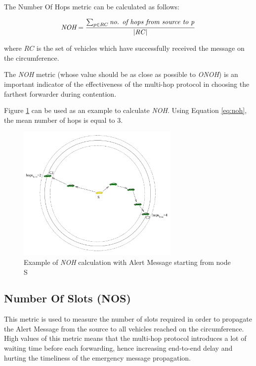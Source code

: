 			The Number Of Hops metric can be calculated as follows:
			
			\begin{gather}
				\label{eq:noh}
				\textit{NOH} = \frac{ \sum_{p \in RC } \textrm{\textit{no. of hops from source to p}}} {\textrm{|\textit{RC}|}}
			\end{gather}
			
			where $RC$ is the set of vehicles which have successfully received the message on the circumference.
			
			
			The \textit{NOH} metric (whose value should be as close as possible to \textit{ONOH}) is an important indicator of the effectiveness of the multi-hop protocol in choosing the farthest forwarder during contention.
			
			
			Figure \ref{fig:hops} can be used as an example to calculate \textit{NOH}. Using Equation \ref{eq:noh}, the mean number of hops is equal to 3.
			
			\begin{figure}[H]
				\centering
				\includegraphics[width=0.7\textwidth]{immagini/hops}
				\caption{Example of \textit{NOH} calculation with Alert Message starting from node S}
				\label{fig:hops}
			\end{figure}
			
		\subsection{Number Of Slots (NOS)}
			This metric is used to measure the number of slots required in order to propagate the Alert Message from the source to all vehicles reached on the circumference. High values of this metric means that the multi-hop protocol introduces a lot of waiting time before each forwarding, hence increasing end-to-end delay and hurting the timeliness of the emergency message propagation.
		
